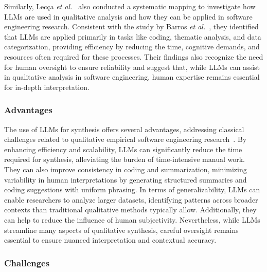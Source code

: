 \documentclass[11pt]{article}
\begin{document}
Similarly, Lecça \textit{et al.}~\cite{leça2024applicationsimplicationslargelanguage} also conducted a systematic mapping to investigate how LLMs are used in qualitative analysis and how they can be applied in software engineering research. Consistent with the study by Barros \textit{et al.}~\cite{barros2024largelanguagemodelqualitative}, they identified that LLMs are applied primarily in tasks like coding, thematic analysis, and data categorization, providing efficiency by reducing the time, cognitive demands, and resources often required for these processes. Their findings also recognize the need for human oversight to ensure reliability and suggest that, while LLMs can assist in qualitative analysis in software engineering, human expertise remains essential for in-depth interpretation.

\subsubsection{Advantages}

The use of LLMs for synthesis offers several advantages, addressing classical challenges related to qualitative empirical software engineering research~\cite{DBLP:journals/ase/BanoHZT24, barros2024largelanguagemodelqualitative, leça2024applicationsimplicationslargelanguage}. By enhancing efficiency and scalability, LLMs can significantly reduce the time required for synthesis, alleviating the burden of time-intensive manual work. They can also improve consistency in coding and summarization, minimizing variability in human interpretations by generating structured summaries and coding suggestions with uniform phrasing. In terms of generalizability, LLMs can enable researchers to analyze larger datasets, identifying patterns across broader contexts than traditional qualitative methods typically allow. Additionally, they can help to reduce the influence of human subjectivity. Nevertheless, while LLMs streamline many aspects of qualitative synthesis, careful oversight remains essential to ensure nuanced interpretation and contextual accuracy.

\subsubsection{Challenges}
\end{document}
